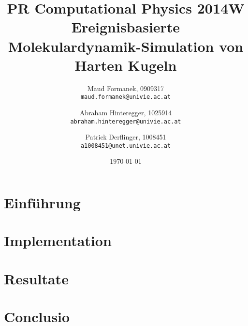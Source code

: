 \documentclass[a4paper]{article}
\title{PR Computational Physics 2014W \\ Ereignisbasierte Molekulardynamik-Simulation von Harten Kugeln}
\author{
	Maud Formanek, 0909317\\
    \texttt{maud.formanek@univie.ac.at}
	\and
    Abraham Hinteregger,  1025914\\
    \texttt{abraham.hinteregger@univie.ac.at}\and
    Patrick Derflinger,  1008451\\
    \texttt{a1008451@unet.univie.ac.at}
    }
\date{\today}
\begin{document}
\maketitle
\tableofcontents

\newpage

\section{Einführung} \label{einfuehrung}


\section{Implementation} \label{implementation}

\section{Resultate} \label{resultate}


\section{Conclusio} \label{conclusio}


\end{document}
